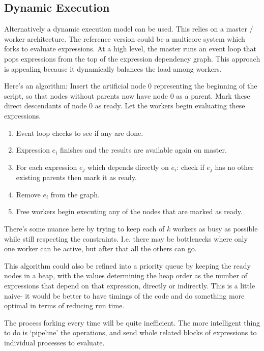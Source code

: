 \documentclass[12pt]{article}
\begin{document}
\subsection{Dynamic Execution}
\label{sec:dynamic}

Alternatively a dynamic execution model can be used. This relies on a
master / worker architecture. The reference version could be a multicore
system which forks to evaluate expressions.  At a high level, the master
runs an event loop that pops expressions from the top of the expression
dependency graph.  This approach is appealing because it dynamically
balances the load among workers.

Here's an algorithm: Insert the artificial node 0 representing the beginning
of the script, so that nodes without parents now have node 0 as a parent. Mark
these direct descendants of node 0 as ready. Let the workers begin evaluating
these expressions.

\begin{enumerate}
    \item Event loop checks to see if any are done.
    \item Expression $e_i$ finishes and the results are available again
        on master.
    \item For each expression $e_j$ which depends directly on $e_i$: check
        if $e_j$ has no other existing parents then mark it as ready.
    \item Remove $e_i$ from the graph.
    \item Free workers begin executing any of the nodes that are marked as ready.
\end{enumerate}

There's some nuance here by trying to keep each of $k$ workers as busy as
possible while still respecting the constraints. I.e. there may be
bottlenecks where only one worker can be active, but after that all the
others can go.

This algorithm could also be refined into a priority queue by keeping the ready
nodes in a heap, with the values determining the heap order as the number
of expressions that depend on that expression, directly or indirectly. This
is a little naive- it would be better to have timings of the code and do
something more optimal in terms of reducing run time.

The process forking every time will be quite inefficient. The more intelligent
thing to do is `pipeline' the operations, and send whole related blocks of
expressions to individual processes to evaluate.
\end{document}
